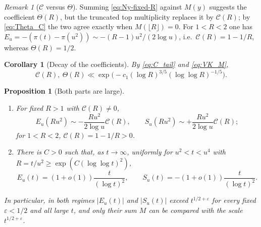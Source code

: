 \documentclass[11pt]{amsart}
\numberwithin{equation}{section}
\theoremstyle{plain}
\newtheorem{proposition}[theorem]{Proposition}
\newtheorem{corollary}[theorem]{Corollary}
\theoremstyle{definition}
\theoremstyle{remark}
\newtheorem{remark}[theorem]{Remark}
\newcommand{\eps}{\varepsilon}
\newcommand{\Cc}{\mathcal{C}}
\begin{document}
\begin{remark}[$\Cc$ versus $\Theta$]
\label{rem:C-vs-Theta}
Summing \eqref{eq:Ny-fixed-R} against $M(y)$ suggests the coefficient
$\Theta(R)$, but the truncated top multiplicity replaces it by $\Cc(R)$; by
\eqref{eq:Theta_C} the two agree exactly when $M(\lfloor R\rfloor)=0$. For
$1<R<2$ one has $E_u=-(\pi(t)-\pi(u^2))\sim-(R-1)u^2/(2\log u)$, i.e.\
$\Cc(R)=1-1/R$, whereas $\Theta(R)=1/2$.
\end{remark}

\begin{corollary}[Decay of the coefficients]
\label{cor:AR-VK}
By \eqref{eq:C_tail} and \eqref{eq:VK_M},
\begin{equation}
\label{eq:AR-VK}
  \Cc(R),\ \Theta(R)\ll\exp\bigl(-c_1(\log R)^{3/5}(\log\log R)^{-1/5}\bigr).
\end{equation}
\end{corollary}

\begin{proposition}[Both parts are large]
\label{prop:both_parts_large}
\begin{enumerate}[label=\textup{(\roman*)}]
\item For fixed $R>1$ with $\Cc(R)\ne0$,
\begin{equation}
\label{eq:E_fixed_R_size}
  E_u(Ru^2)\sim-\frac{Ru^2}{2\log u}\Cc(R),\qquad
  S_u(Ru^2)\sim+\frac{Ru^2}{2\log u}\Cc(R);
\end{equation}
for $1<R<2$, $\Cc(R)=1-1/R>0$.
\item There is $C>0$ such that, as $t\to\infty$, uniformly for $u^2<t<u^4$
with $R=t/u^2\ge\exp(C(\log\log t)^2)$,
\begin{equation}
\label{eq:E_log2}
  E_u(t)=(1+o(1))\frac{t}{(\log t)^2},\qquad
  S_u(t)=-(1+o(1))\frac{t}{(\log t)^2}.
\end{equation}
\end{enumerate}
In particular, in both regimes $|E_u(t)|$ and $|S_u(t)|$ exceed
$t^{1/2+\eps}$ for every fixed $\eps<1/2$ and all large $t$, and only their
sum $M$ can be compared with the scale $t^{1/2+\eps}$.
\end{proposition}
\end{document}

